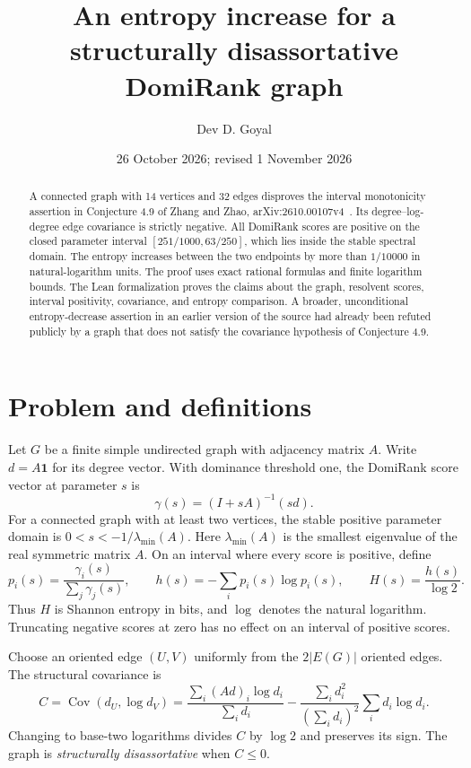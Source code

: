 \documentclass[11pt,a4paper]{article}
\title{An entropy increase for a structurally disassortative DomiRank graph}
\author{Dev D. Goyal}
\date{26 October 2026; revised 1 November 2026}
\newcommand{\one}{\mathbf 1}
\begin{document}
\maketitle
\begin{abstract}
A connected graph with 14 vertices and 32 edges disproves the interval
monotonicity assertion in Conjecture 4.9 of Zhang and Zhao,
arXiv:2610.00107v4~\cite{zhangzhao}. Its degree--log-degree edge covariance is strictly
negative. All DomiRank scores are positive on the closed parameter interval
$[251/1000,63/250]$, which lies inside the stable spectral domain.
The entropy increases between the two endpoints by more than $1/10000$
in natural-logarithm units.
The proof uses exact rational formulas and finite logarithm bounds.
The Lean formalization proves the claims about the graph, resolvent scores,
interval positivity, covariance, and entropy comparison.
A broader, unconditional entropy-decrease assertion in an earlier version of
the source had already been refuted publicly by a graph that does not satisfy
the covariance hypothesis of Conjecture 4.9.
\end{abstract}

\section{Problem and definitions}
Let $G$ be a finite simple undirected graph with adjacency matrix $A$.
Write $d=A\one$ for its degree vector. With dominance threshold one,
the DomiRank score vector at parameter $s$ is
\begin{equation}\label{eq:gamma}
 \gamma(s)=(I+sA)^{-1}(sd).
\end{equation}
For a connected graph with at least two vertices, the stable positive
parameter domain is $0<s<-1/\lambda_{\min}(A)$.
Here $\lambda_{\min}(A)$ is the smallest eigenvalue of the real symmetric
matrix $A$. On an interval where every score is positive, define
\[
 p_i(s)=\frac{\gamma_i(s)}{\sum_j\gamma_j(s)},\qquad
 h(s)=-\sum_i p_i(s)\log p_i(s),\qquad H(s)=\frac{h(s)}{\log 2}.
\]
Thus $H$ is Shannon entropy in bits, and $\log$ denotes the natural logarithm.
Truncating negative scores at zero has no effect on an interval of positive scores.

Choose an oriented edge $(U,V)$ uniformly from the $2|E(G)|$ oriented
edges. The structural covariance is
\begin{equation}\label{eq:cov}
 C=\operatorname{Cov}(d_U,\log d_V)
 =\frac{\sum_i(Ad)_i\log d_i}{\sum_i d_i}
 -\frac{\sum_i d_i^2}{(\sum_i d_i)^2}\sum_i d_i\log d_i.
\end{equation}
Changing to base-two logarithms divides $C$ by $\log 2$ and preserves its sign.
The graph is \emph{structurally disassortative} when $C\leq0$.
\end{document}
